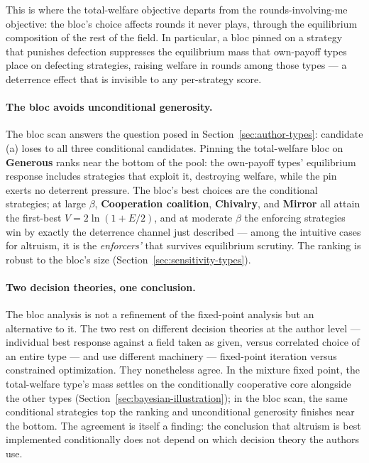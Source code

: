 This is where the total-welfare objective departs from the
rounds-involving-me objective: the bloc's choice affects rounds it
never plays, through the equilibrium composition of the rest of the
field.
In particular, a bloc pinned on a strategy that punishes defection
suppresses the equilibrium mass that own-payoff types place on
defecting strategies, raising welfare in rounds among those types ---
a deterrence effect that is invisible to any per-strategy score.

\paragraph{The bloc avoids unconditional generosity.}
The bloc scan answers the question posed in
Section~\ref{sec:author-types}: candidate (a) loses to all three
conditional candidates.
Pinning the total-welfare bloc on \textbf{Generous} ranks near the
bottom of the pool: the own-payoff types' equilibrium response
includes strategies that exploit it, destroying welfare, while the
pin exerts no deterrent pressure.
The bloc's best choices are the conditional strategies; at large
$\beta$, \textbf{Cooperation coalition}, \textbf{Chivalry}, and
\textbf{Mirror} all attain the first-best $V = 2\ln(1 + E/2)$, and at
moderate $\beta$ the enforcing strategies win by exactly the
deterrence channel just described --- among the intuitive cases for
altruism, it is the \emph{enforcers'} that survives equilibrium
scrutiny.
The ranking is robust to the bloc's size
(Section~\ref{sec:sensitivity-types}).

\paragraph{Two decision theories, one conclusion.}
The bloc analysis is not a refinement of the fixed-point analysis
but an alternative to it.
The two rest on different decision theories at the author level ---
individual best response against a field taken as given, versus
correlated choice of an entire type --- and use different machinery
--- fixed-point iteration versus constrained optimization.
They nonetheless agree.
In the mixture fixed point, the total-welfare type's mass settles on
the conditionally cooperative core alongside the other types
(Section~\ref{sec:bayesian-illustration}); in the bloc scan, the
same conditional strategies top the ranking and unconditional
generosity finishes near the bottom.
The agreement is itself a finding: the conclusion that altruism is
best implemented conditionally does not depend on which decision
theory the authors use.

